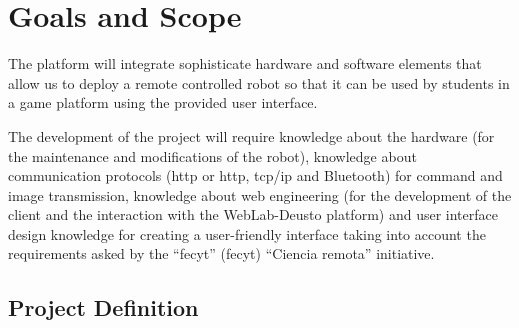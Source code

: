 \chapter{Goals and Scope}

The platform will integrate sophisticate hardware and software elements that allow us to deploy a
remote controlled robot so that it can be used by students in a game platform using the provided
user interface.

The development of the project will require knowledge about the hardware (for the maintenance and
modifications of the robot), knowledge about communication protocols (\acrlong{http} or
\acrshort{http}, \acrshort{tcp}/\acrshort{ip} and Bluetooth) for command and image transmission,
knowledge about web engineering (for the development of the client and the interaction with the
WebLab-Deusto platform) and user interface design knowledge for creating a user-friendly interface
taking into account the requirements asked by the ``\acrlong{fecyt}'' (\acrshort{fecyt}) ``Ciencia
remota'' initiative.

\section{Project Definition}

